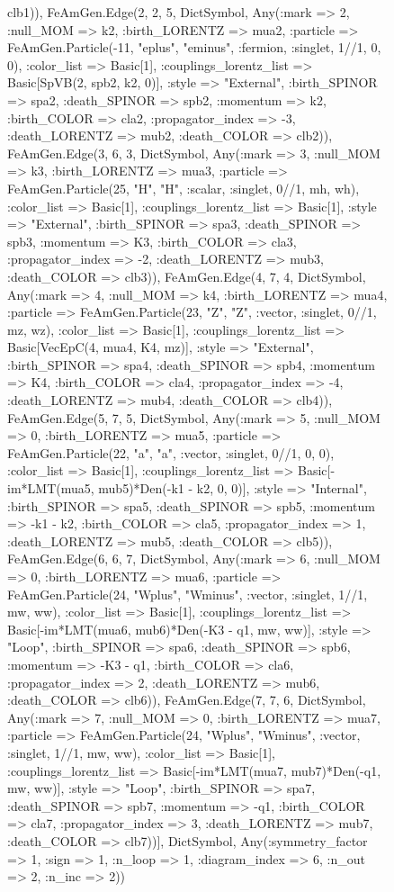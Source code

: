 \documentclass{revtex4}
\begin{document}
\begin{figure}[!htb]
\begin{center}
{clb1)), FeAmGen.Edge(2, 2, 5, Dict{Symbol, Any}(:mark => 2, :null_MOM => k2, :birth_LORENTZ => mua2, :particle => FeAmGen.Particle(-11, "eplus", "eminus", :fermion, :singlet, 1//1, 0, 0), :color_list => Basic[1], :couplings_lorentz_list => Basic[SpVB(2, spb2, k2, 0)], :style => "External", :birth_SPINOR => spa2, :death_SPINOR => spb2, :momentum => k2, :birth_COLOR => cla2, :propagator_index => -3, :death_LORENTZ => mub2, :death_COLOR => clb2)), FeAmGen.Edge(3, 6, 3, Dict{Symbol, Any}(:mark => 3, :null_MOM => k3, :birth_LORENTZ => mua3, :particle => FeAmGen.Particle(25, "H", "H", :scalar, :singlet, 0//1, mh, wh), :color_list => Basic[1], :couplings_lorentz_list => Basic[1], :style => "External", :birth_SPINOR => spa3, :death_SPINOR => spb3, :momentum => K3, :birth_COLOR => cla3, :propagator_index => -2, :death_LORENTZ => mub3, :death_COLOR => clb3)), FeAmGen.Edge(4, 7, 4, Dict{Symbol, Any}(:mark => 4, :null_MOM => k4, :birth_LORENTZ => mua4, :particle => FeAmGen.Particle(23, "Z", "Z", :vector, :singlet, 0//1, mz, wz), :color_list => Basic[1], :couplings_lorentz_list => Basic[VecEpC(4, mua4, K4, mz)], :style => "External", :birth_SPINOR => spa4, :death_SPINOR => spb4, :momentum => K4, :birth_COLOR => cla4, :propagator_index => -4, :death_LORENTZ => mub4, :death_COLOR => clb4)), FeAmGen.Edge(5, 7, 5, Dict{Symbol, Any}(:mark => 5, :null_MOM => 0, :birth_LORENTZ => mua5, :particle => FeAmGen.Particle(22, "a", "a", :vector, :singlet, 0//1, 0, 0), :color_list => Basic[1], :couplings_lorentz_list => Basic[-im*LMT(mua5, mub5)*Den(-k1 - k2, 0, 0)], :style => "Internal", :birth_SPINOR => spa5, :death_SPINOR => spb5, :momentum => -k1 - k2, :birth_COLOR => cla5, :propagator_index => 1, :death_LORENTZ => mub5, :death_COLOR => clb5)), FeAmGen.Edge(6, 6, 7, Dict{Symbol, Any}(:mark => 6, :null_MOM => 0, :birth_LORENTZ => mua6, :particle => FeAmGen.Particle(24, "Wplus", "Wminus", :vector, :singlet, 1//1, mw, ww), :color_list => Basic[1], :couplings_lorentz_list => Basic[-im*LMT(mua6, mub6)*Den(-K3 - q1, mw, ww)], :style => "Loop", :birth_SPINOR => spa6, :death_SPINOR => spb6, :momentum => -K3 - q1, :birth_COLOR => cla6, :propagator_index => 2, :death_LORENTZ => mub6, :death_COLOR => clb6)), FeAmGen.Edge(7, 7, 6, Dict{Symbol, Any}(:mark => 7, :null_MOM => 0, :birth_LORENTZ => mua7, :particle => FeAmGen.Particle(24, "Wplus", "Wminus", :vector, :singlet, 1//1, mw, ww), :color_list => Basic[1], :couplings_lorentz_list => Basic[-im*LMT(mua7, mub7)*Den(-q1, mw, ww)], :style => "Loop", :birth_SPINOR => spa7, :death_SPINOR => spb7, :momentum => -q1, :birth_COLOR => cla7, :propagator_index => 3, :death_LORENTZ => mub7, :death_COLOR => clb7))], Dict{Symbol, Any}(:symmetry_factor => 1, :sign => 1, :n_loop => 1, :diagram_index => 6, :n_out => 2, :n_inc => 2)) 
}
\end{center}
\end{figure}
\end{document}
